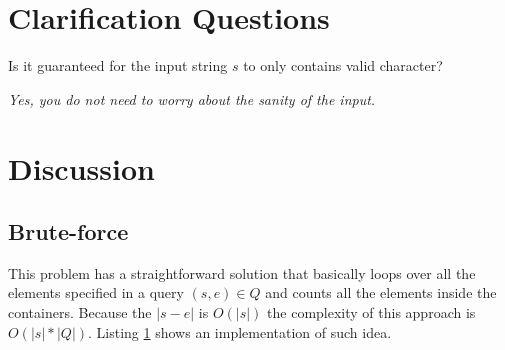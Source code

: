 \section{Clarification Questions}

\begin{QandA}
	\item Is it guaranteed for the input string $s$ to only contains valid character?
	\begin{answered}
		\textit{Yes, you do not need to worry about the sanity of the input.}
	\end{answered}
\end{QandA}

\section{Discussion}
\label{items_in_containers_amazon:sec:discussion}



\subsection{Brute-force}
\label{items_in_containers_amazon:sec:bruteforce}
This problem has a straightforward solution that basically loops over all the elements  specified in a query $(s,e) \in Q$
and counts all the elements inside the containers. Because the $|s-e|$ is $O(|s|)$ the complexity of this approach is $O(|s|*|Q|)$. 
Listing \ref{} shows an implementation of such idea.



